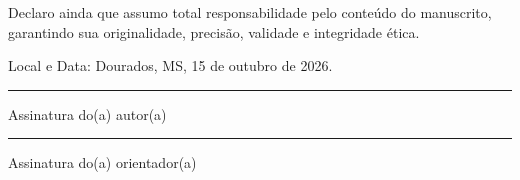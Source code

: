 \documentclass[12pt,a4paper]{article}
\begin{document}
\vspace{0.5cm}

Declaro ainda que assumo total responsabilidade pelo conteúdo do manuscrito,
garantindo sua originalidade, precisão, validade e integridade ética.

\vspace{0.8cm}

Local e Data: Dourados, MS, 15 de outubro de 2026.

\vspace{2cm}

\noindent\rule{7cm}{0.4pt}

\noindent Assinatura do(a) autor(a)

\vspace{1.5cm}

\noindent\rule{7cm}{0.4pt}

\noindent Assinatura do(a) orientador(a)
\end{document}
